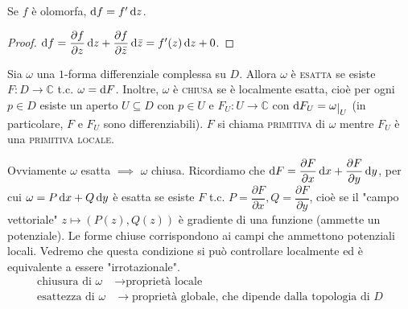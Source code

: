 \begin{cor}
  Se $f$ è olomorfa, $\mathop{}\!\mathrm{d} f=f' \mathop{}\!\mathrm{d} z$.
\end{cor}

\begin{proof}
  $\mathop{}\!\mathrm{d} f=\dfrac{\partial f}{\partial z}\mathop{}\!\mathrm{d} z+\dfrac{\partial f}{\partial \bar{z}}\mathop{}\!\mathrm{d} \bar{z}=f'(z)\mathop{}\!\mathrm{d} z+0$.
\end{proof}

\begin{defn}
  Sia $\omega$ una $1$-forma differenziale complessa su $D$. Allora $\omega$ è \textsc{esatta} se esiste $F:D \longrightarrow \mathbb{C}$ t.c. $\omega=\mathop{}\!\mathrm{d} F$.
  Inoltre, $\omega$ è \textsc{chiusa} se è localmente esatta, cioè per ogni $p \in D$ esiste un aperto $U \subseteq D$ con $p \in U$ e $F_U:U \longrightarrow \mathbb{C}$ con $\diff F_U=\omega\restrict{U}$ (in particolare, $F$ e $F_U$ sono differenziabili). $F$ si chiama \textsc{primitiva} di $\omega$ mentre $F_U$ è una \textsc{primitiva locale}.
\end{defn}

Ovviamente $\omega$ esatta $\implies$ $\omega$ chiusa. Ricordiamo che $\mathop{}\!\mathrm{d} F=\dfrac{\partial F}{\partial x}\mathop{}\!\mathrm{d} x+\dfrac{\partial F}{\partial y}\mathop{}\!\mathrm{d} y$, per cui $\omega=P\mathop{}\!\mathrm{d} x+Q\mathop{}\!\mathrm{d} y$ è esatta se esiste $F$ t.c. $P=\dfrac{\partial F}{\partial x}, Q=\dfrac{\partial F}{\partial y}$, cioè se il "campo vettoriale" $z \longmapsto (P(z), Q(z))$ è gradiente di una funzione (ammette un potenziale).
Le forme chiuse corrispondono ai campi che ammettono potenziali locali. Vedremo che questa condizione si può controllare localmente ed è equivalente a essere "irrotazionale".
\begin{align*}
  \text{chiusura di } \omega &\longrightarrow \text{proprietà locale}\\
  \text{esattezza di } \omega &\longrightarrow \text{proprietà globale, che dipende dalla topologia di $D$}
\end{align*}
